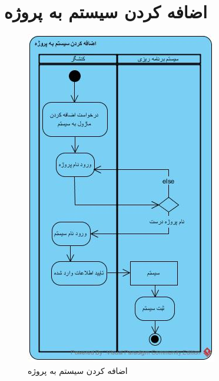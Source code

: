\section{اضافه کردن سیستم به پروژه}
\begin{figure}[H]
	\centering
	\includegraphics[scale=0.8]{img/activity/AddSystemToProject}
	\caption{اضافه کردن سیستم به پروژه}
\end{figure}

